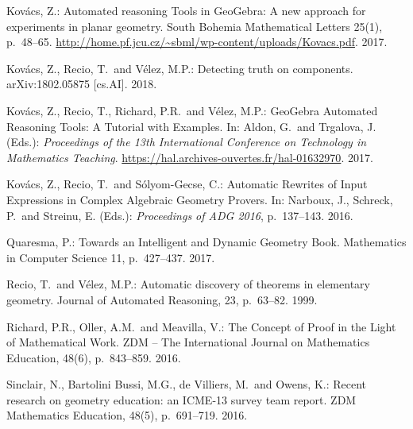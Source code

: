 \begin{thebibliography}{10}
Kov\'acs, Z.: Automated reasoning Tools in GeoGebra:
A new approach for experiments in planar geometry.
South Bohemia Mathematical Letters 25(1), p.~48--65.
\url{http://home.pf.jcu.cz/~sbml/wp-content/uploads/Kovacs.pdf}. 2017.

Kov\'acs, Z., Recio, T.~and V\'elez, M.P.:
Detecting truth on components. arXiv:1802.05875 [cs.AI]. 2018.

Kov\'acs, Z., Recio, T., Richard, P.R.~and V\'elez, M.P.: GeoGebra Automated
Reasoning Tools: A Tutorial with Examples. In: Aldon, G.~and Trgalova, J. (Eds.):
\textit{Proceedings of the 13th International
Conference on Technology in Mathematics Teaching}.
\url{https://hal.archives-ouvertes.fr/hal-01632970}. 2017.

Kov\'acs, Z., Recio, T.~and S\'olyom-Gecse, C.:
Automatic Rewrites of Input Expressions in Complex Algebraic Geometry Provers.
In: Narboux, J., Schreck, P.~and Streinu, E. (Eds.): \textit{Proceedings of ADG 2016}, p.~137--143. 2016.

Quaresma, P.: Towards an Intelligent and Dynamic Geometry Book.
Mathematics in Computer Science 11, p.~427--437. 2017.

Recio, T.~and V\'elez, M.P.:
Automatic discovery of theorems in elementary geometry.
Journal of Automated Reasoning, 23, p.~63--82.
1999.

Richard, P.R., Oller, A.M.~and Meavilla, V.:
The Concept of Proof in the Light of Mathematical Work.
ZDM -- The International Journal on Mathematics Education, 48(6), p.~843--859. 2016.

Sinclair, N., Bartolini Bussi, M.G., de Villiers, M.~and Owens, K.:
Recent research on geometry education: an ICME-13 survey team report.
ZDM Mathematics Education, 48(5), p.~691--719. 2016.


\end{thebibliography}
